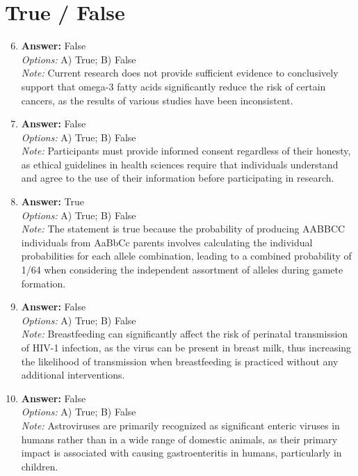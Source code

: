 \documentclass[12pt]{article}
\begin{document}
\section*{True / False}
\begin{enumerate}[label=\arabic*.]
\setcounter{enumi}{5}
\item \textbf{Answer:} False
\\ \textit{Options:} A) True; B) False
\\ \textit{Note:} Current research does not provide sufficient evidence to conclusively support that omega-3 fatty acids significantly reduce the risk of certain cancers, as the results of various studies have been inconsistent.
\item \textbf{Answer:} False
\\ \textit{Options:} A) True; B) False
\\ \textit{Note:} Participants must provide informed consent regardless of their honesty, as ethical guidelines in health sciences require that individuals understand and agree to the use of their information before participating in research.
\item \textbf{Answer:} True
\\ \textit{Options:} A) True; B) False
\\ \textit{Note:} The statement is true because the probability of producing AABBCC individuals from AaBbCc parents involves calculating the individual probabilities for each allele combination, leading to a combined probability of 1/64 when considering the independent assortment of alleles during gamete formation.
\item \textbf{Answer:} False
\\ \textit{Options:} A) True; B) False
\\ \textit{Note:} Breastfeeding can significantly affect the risk of perinatal transmission of HIV-1 infection, as the virus can be present in breast milk, thus increasing the likelihood of transmission when breastfeeding is practiced without any additional interventions.
\item \textbf{Answer:} False
\\ \textit{Options:} A) True; B) False
\\ \textit{Note:} Astroviruses are primarily recognized as significant enteric viruses in humans rather than in a wide range of domestic animals, as their primary impact is associated with causing gastroenteritis in humans, particularly in children.
\end{enumerate}
\end{document}
